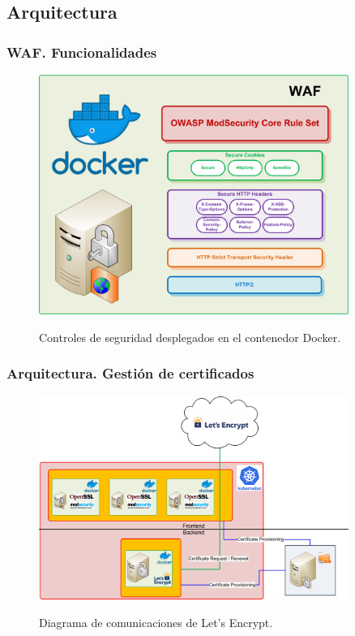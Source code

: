 \subsection{Arquitectura}
\begin{frame}[shrink]
  \frametitle{WAF. Funcionalidades}
  \begin{figure}
		\includegraphics[width=0.9\textwidth]{fig/Diagram_Docker_WAF}
		\label{fig:Diagrama Docker WAF}
		\caption{Controles de seguridad desplegados en el contenedor Docker.}
  \end{figure}
\end{frame}

\begin{frame}[shrink]
  \frametitle{Arquitectura. Gestión de certificados}
  \begin{figure}
    \includegraphics[width=0.9\textwidth]{fig/Diagram_LetsEncypt_LLD}
    \label{fig:Diagram_LetsEncypt_LLD}
    \caption{Diagrama de comunicaciones de Let's Encrypt.}

  \end{figure}
\end{frame}

